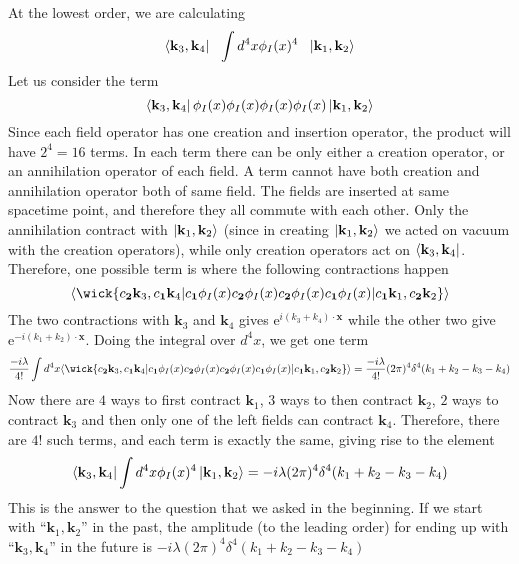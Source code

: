 \documentclass[11pt, notitlepage]{report}
\newcommand{\e}{\mathrm{e}}
\renewcommand{\c}[1]{c_\mathbf{#1}}
\numberwithin{equation}{section}
\begin{document}
    At the lowest order, we are calculating 
    \begin{equation*}
        \bra{\textbf{k}_3, \textbf{k}_4} ~~ \int d^4x \phi_I(x)^4~~ \ket{\textbf{k}_1, \textbf{k}_2}
    \end{equation*}
    Let us consider the term 
    \begin{equation*}
        \bra{\textbf{k}_3, \textbf{k}_4} \phi_I(x)\phi_I(x)\phi_I(x)\phi_I(x) \ket{\textbf{k}_1, \textbf{k}_2}
    \end{equation*}
    Since each field operator has one creation and insertion operator, the product will have \(2^4 = 16\) terms. In each term there can be only either a creation operator, or an annihilation operator of each field. A term cannot have both creation and annihilation operator both of same field. The fields are inserted at same spacetime point, and therefore they all commute with each other. Only the annihilation contract with \( \ket{\textbf{k}_1, \textbf{k}_2}\) (since in creating \(\ket{\textbf{k}_1, \textbf{k}_2}\) we acted on vacuum with the creation operators), while only creation operators act on \(\bra{\textbf{k}_3, \textbf{k}_4}\). Therefore, one possible term is where the following contractions happen 
    \begin{equation*}
        \langle \wick{\c2{\mathbf{k}_3},\c1{\mathbf{k}_4}| \c1 \phi_I(x) \c2 \phi_I(x) \c2 \phi_I(x) \c1 \phi_I(x) | \c1{\mathbf{k}_1},\c2{\mathbf{k}_2}}\rangle 
    \end{equation*}
    The two contractions with \(\textbf{k}_3\) and \(\textbf{k}_4\) gives \(\e^{i(k_3 + k_4)\cdot \textbf{x}}\) while the other two give \(\e^{-i(k_1 + k_2)\cdot \textbf{x}}\). Doing the integral over \(d^4x\), we get one term 
    \begin{equation*}
        \frac{-i\lambda}{4!}\int d^4x \langle \wick{\c2{\mathbf{k}_3},\c1{\mathbf{k}_4}| \c1 \phi_I(x) \c2 \phi_I(x) \c2 \phi_I(x) \c1 \phi_I(x) | \c1{\mathbf{k}_1},\c2{\mathbf{k}_2}}\rangle  = \frac{-i\lambda}{4!}(2\pi)^4 \delta^4(k_1 + k_2 - k_3 - k_4) 
    \end{equation*}
    Now there are \(4\) ways to first contract \(\textbf{k}_1\), \(3\) ways to then contract \(\textbf{k}_2\), \(2\) ways to contract \(\textbf{k}_3\) and then only one of the left fields can contract \(\textbf{k}_4\). Therefore, there are \(4!\) such terms, and each term is exactly the same, giving rise to the element 
    \begin{equation*}
        \bra{\textbf{k}_3, \textbf{k}_4} \int d^4x \phi_I(x)^4 \ket{\textbf{k}_1, \textbf{k}_2} = -i\lambda(2\pi)^4 \delta^4(k_1 + k_2 - k_3 - k_4) 
    \end{equation*} 
    This is the answer to the question that we asked in the beginning. If we start with ``\(\textbf{k}_1,\textbf{k}_2\)'' in the past, the amplitude (to the leading order) for ending up with ``\(\textbf{k}_3, \textbf{k}_4\)'' in the future is \(-i\lambda(2\pi)^4 \delta^4(k_1 + k_2 - k_3 - k_4)\)\\
\end{document}
